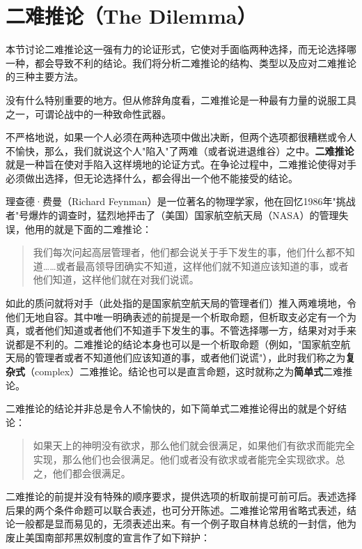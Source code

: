 \section{二难推论（The Dilemma）}

\begin{logicbox}[title=引言]
本节讨论二难推论这一强有力的论证形式，它使对手面临两种选择，而无论选择哪一种，都会导致不利的结论。我们将分析二难推论的结构、类型以及应对二难推论的三种主要方法。
\end{logicbox}

没有什么特别重要的地方。但从修辞角度看，二难推论是一种最有力量的说服工具之一，可谓论战中的一种致命性武器。

不严格地说，如果一个人必须在两种选项中做出决断，但两个选项都很糟糕或令人不愉快，那么，我们就说这个人"陷入"了两难（或者说进退维谷）之中。\textbf{二难推论}就是一种旨在使对手陷入这样境地的论证方式。在争论过程中，二难推论使得对手必须做出选择，但无论选择什么，都会得出一个他不能接受的结论。

理查德·费曼（Richard Feynman）是一位著名的物理学家，他在回忆1986年"挑战者"号爆炸的调查时，猛烈地抨击了（美国）国家航空航天局（NASA）的管理失误，他用的就是下面的二难推论：

\begin{quote}
我们每次问起高层管理者，他们都会说关于手下发生的事，他们什么都不知道……或者最高领导团确实不知道，这样他们就不知道应该知道的事，或者他们知道，这样他们就在对我们说谎。\cite{feynman1988}
\end{quote}

如此的质问就将对手（此处指的是国家航空航天局的管理者们）推入两难境地，令他们无地自容。其中唯一明确表述的前提是一个析取命题，但析取支必定有一个为真，或者他们知道或者他们不知道手下发生的事。不管选择哪一方，结果对对手来说都是不利的。二难推论的结论本身也可以是一个析取命题（例如，"国家航空航天局的管理者或者不知道他们应该知道的事，或者他们说谎"），此时我们称之为\textbf{复杂式}（complex）二难推论。结论也可以是直言命题，这时就称之为\textbf{简单式}二难推论。

二难推论的结论并非总是令人不愉快的，如下简单式二难推论得出的就是个好结论：

\begin{quote}
如果天上的神明没有欲求，那么他们就会很满足，如果他们有欲求而能完全实现，那么他们也会很满足。他们或者没有欲求或者能完全实现欲求。总之，他们都会很满足。
\end{quote}

二难推论的前提并没有特殊的顺序要求，提供选项的析取前提可前可后。表述选择后果的两个条件命题可以联合表述，也可分开陈述。二难推论常用省略式表述，结论一般都是显而易见的，无须表述出来。有一个例子取自林肯总统的一封信，他为废止美国南部邦黑奴制度的宣言作了如下辩护：

